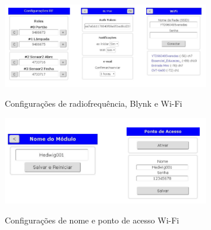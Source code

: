 \begin{figure}[H]
	\centering
	\caption{Configurações de radiofrequência, Blynk e Wi-Fi}
	\includegraphics[width=0.8\textwidth]{configRFBlynkWiFi}
	\label{fig:configRFBlynkWiFi}
\end{figure}

\begin{figure}[H]
	\centering
	\caption{Configurações de nome e ponto de acesso Wi-Fi}
	\includegraphics[width=0.8\textwidth]{confignomeptoacessoWiFi}
	\label{fig:confignomeptoacessoWiFi}
\end{figure}
